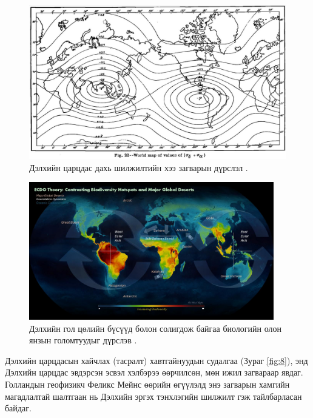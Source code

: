 \documentclass[10pt,twocolumn,letterpaper]{article}
\begin{document}
\begin{figure}[t]
\begin{center}
   \includegraphics[width=1\linewidth]{meinesz3.jpg}
\end{center}
   \caption{Дэлхийн царцдас дахь шилжилтийн хээ загварын дүрслэл \cite{36}.}
\label{fig:8}
\label{fig:onecol}
\end{figure}
\begin{figure}[t]
\begin{center}
\includegraphics[width=0.95\textwidth]{biodiversity.jpg}
\end{center}
   \caption{Дэлхийн гол цөлийн бүсүүд болон солигдож байгаа биологийн олон янзын голомтуудыг дүрслэв \cite{28}.}
\label{fig:9}
\end{figure}

Дэлхийн царцдасын хайчлах (тасралт) хавтгайнуудын судалгаа (Зураг \ref{fig:8}), энд Дэлхийн царцдас эвдэрсэн эсвэл хэлбэрээ өөрчилсөн, мөн ижил загвараар явдаг. Голландын геофизикч Феликс Мейнс өөрийн өгүүлэлд \cite{36} энэ загварын хамгийн магадлалтай шалтгаан нь Дэлхийн эргэх тэнхлэгийн шилжилт гэж тайлбарласан байдаг.
\end{document}
